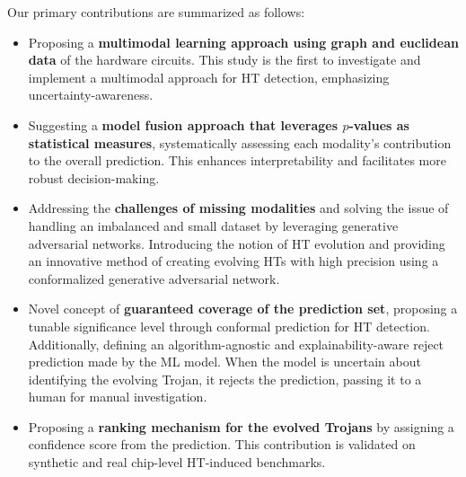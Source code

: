 Our primary contributions are summarized as follows:

\begin{itemize}
\item Proposing a \textbf{multimodal learning approach using graph and euclidean data} of the hardware circuits. This study is the first to investigate and implement a multimodal approach for HT detection, emphasizing uncertainty-awareness.
\item Suggesting a \textbf{model fusion approach that leverages $p$-values as statistical measures}, systematically assessing each modality's contribution to the overall prediction. This enhances interpretability and facilitates more robust decision-making.
\item Addressing the \textbf{challenges of missing modalities} and solving the issue of handling an imbalanced and small dataset by leveraging generative adversarial networks. Introducing the notion of HT evolution and providing an innovative method of creating evolving HTs with high precision using a conformalized generative adversarial network.
\item Novel concept of \textbf{guaranteed coverage of the prediction set}, proposing a tunable significance level through conformal prediction for HT detection. Additionally, defining an algorithm-agnostic and explainability-aware reject prediction made by the ML model. When the model is uncertain about identifying the evolving Trojan, it rejects the prediction, passing it to a human for manual investigation.
\item Proposing a \textbf{ranking mechanism for the evolved Trojans} by assigning a confidence score from the prediction. This contribution is validated on synthetic and real chip-level HT-induced benchmarks.
\end{itemize}


\endgroup